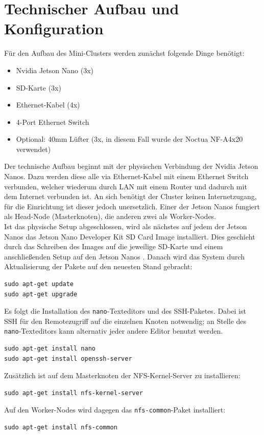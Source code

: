 \documentclass[doktyp=semarbeit, sprache=german]{TUBAFarbeiten}
\begin{document}
\section{Technischer Aufbau und Konfiguration}
Für den Aufbau des Mini-Clusters werden zunächst folgende Dinge benötigt:
\begin{itemize}
	\item Nvidia Jetson Nano (3x)
	\item SD-Karte (3x)
	\item Ethernet-Kabel (4x)
	\item 4-Port Ethernet Switch
	\item Optional: 40mm Lüfter (3x, in diesem Fall wurde der Noctua NF-A4x20 verwendet)
\end{itemize}
Der technische Aufbau beginnt mit der physischen Verbindung der Nvidia Jetson Nanos. Dazu werden diese alle via Ethernet-Kabel mit einem Ethernet Switch verbunden, welcher wiederum durch LAN mit einem Router und dadurch mit dem Internet verbunden ist. An sich benötigt der Cluster keinen Internetzugang, für die Einrichtung ist dieser jedoch unersetzlich. Einer der Jetson Nanos fungiert als Head-Node (Masterknoten), die anderen zwei als Worker-Nodes.
\\Ist das physische Setup abgeschlossen, wird als nächstes auf jedem der Jetson Nanos das Jetson Nano Developer Kit SD Card Image installiert. Dies geschieht durch das Schreiben des Images auf die jeweilige SD-Karte und einem anschließenden Setup auf den Jetson Nanos \cite{SDImage}. Danach wird das System durch Aktualisierung der Pakete auf den neuesten Stand gebracht:
\begin{lstlisting}
sudo apt-get update
sudo apt-get upgrade
\end{lstlisting}
Es folgt die Installation des \texttt{nano}-Texteditors und des SSH-Paketes. Dabei ist SSH für den Remotezugriff auf die einzelnen Knoten notwendig; an Stelle des \texttt{nano}-Texteditors kann alternativ jeder andere Editor benutzt werden.
\begin{lstlisting}
sudo apt-get install nano
sudo apt-get install openssh-server
\end{lstlisting}
Zusätzlich ist auf dem Masterknoten der NFS-Kernel-Server zu installieren:
\begin{lstlisting}
sudo apt-get install nfs-kernel-server
\end{lstlisting}
Auf den Worker-Nodes wird dagegen das \texttt{nfs-common}-Paket installiert:
\begin{lstlisting}
sudo apt-get install nfs-common
\end{lstlisting}
\end{document}
